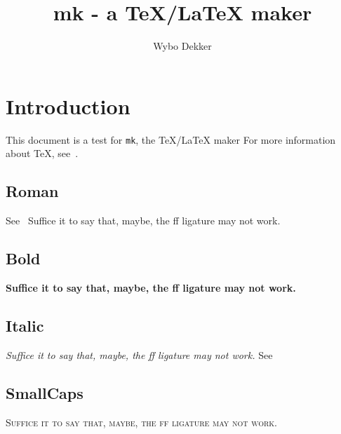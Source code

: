 \documentclass[11pt,a4paper]{book}
\title{mk - a TeX/LaTeX maker}
\author{Wybo Dekker}
\def\Liga{Suffice it to say that, maybe, the f{}f ligature may not work.}
\begin{document}
\maketitle
\tableofcontents
\chapter{Introduction}
This document is a test for \texttt{mk}, the TeX/LaTeX maker
For more information about TeX, see~\cite{texbook}.

\section{Roman}
\kant[1] See~\cite{gracom}
\Liga

\section{Bold}
{\bfseries \kant[2] \Liga}

\section{Italic}
{\itshape \kant[3] \Liga} See~\cite{latcomp}

\section{SmallCaps}
{\scshape \kant[4] \Liga}


\printindex
\end{document}
